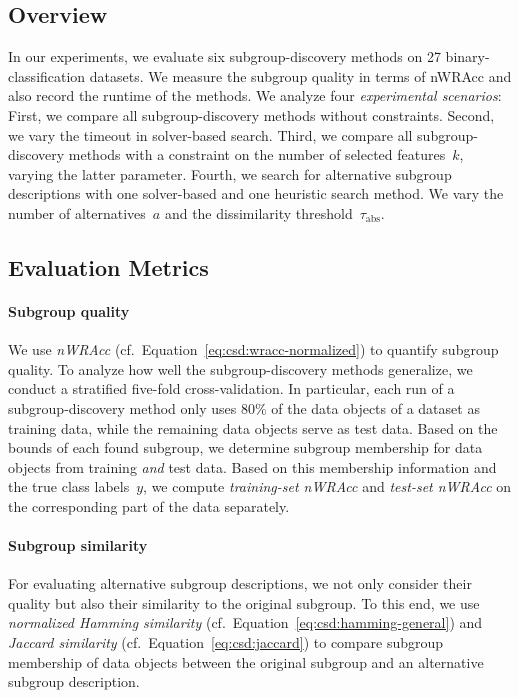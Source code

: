 \documentclass{article}
\theoremstyle{definition}
\begin{document}
\subsection{Overview}
\label{sec:csd:experimental-design:overview}

In our experiments, we evaluate six subgroup-discovery methods on 27 binary-classification datasets.
We measure the subgroup quality in terms of nWRAcc and also record the runtime of the methods.
We analyze four \emph{experimental scenarios}:
First, we compare all subgroup-discovery methods without constraints.
Second, we vary the timeout in solver-based search.
Third, we compare all subgroup-discovery methods with a constraint on the number of selected features~$k$, varying the latter parameter.
Fourth, we search for alternative subgroup descriptions with one solver-based and one heuristic search method.
We vary the number of alternatives~$a$ and the dissimilarity threshold~$\tau_{\text{abs}}$.

\subsection{Evaluation Metrics}
\label{sec:csd:experimental-design:metrics}

\paragraph{Subgroup quality}

We use \emph{nWRAcc} (cf.~Equation~\ref{eq:csd:wracc-normalized}) to quantify subgroup quality.
To analyze how well the subgroup-discovery methods generalize, we conduct a stratified five-fold cross-validation.
In particular, each run of a subgroup-discovery method only uses 80\% of the data objects of a dataset as training data, while the remaining data objects serve as test data.
Based on the bounds of each found subgroup, we determine subgroup membership for data objects from training \emph{and} test data.
Based on this membership information and the true class labels~$y$, we compute \emph{training-set nWRAcc} and \emph{test-set nWRAcc} on the corresponding part of the data separately.

\paragraph{Subgroup similarity}

For evaluating alternative subgroup descriptions, we not only consider their quality but also their similarity to the original subgroup.
To this end, we use \emph{normalized Hamming similarity} (cf.~Equation~\ref{eq:csd:hamming-general}) and \emph{Jaccard similarity} (cf.~Equation~\ref{eq:csd:jaccard}) to compare subgroup membership of data objects between the original subgroup and an alternative subgroup description.
\end{document}
